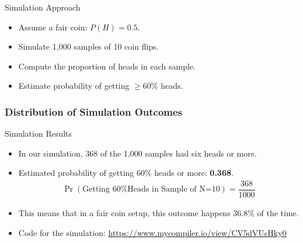 \documentclass[]{beamer} %
\begin{document}
\begin{frame}{Simulation Approach}
    \begin{itemize}
        \item Assume a fair coin: $P(H) = 0.5$.
        \item Simulate 1,000 samples of 10 coin flips.
        \item Compute the proportion of heads in each sample.
        \item Estimate probability of getting $\geq 60\%$ heads.
    \end{itemize}
\end{frame}


\begin{frame}
    \frametitle{Distribution of Simulation Outcomes}

    \begin{figure}
        \centering
    \end{figure}

\end{frame}

\begin{frame}{Simulation Results}
    \begin{itemize}
    \item In our simulation, 368 of the 1,000 samples had six heads or more. 
        \item Estimated probability of getting 60\% heads or more: \textbf{0.368}.
        \begin{align*}
            \Pr( \text{Getting 60\% Heads in Sample of N=10} ) = \dfrac{368}{1000}
        \end{align*}
        \item This means that in a fair coin setup, this outcome happens 36.8\% of the time.
        \item Code for the simulation:  
        { \href{https://www.mycompiler.io/view/CV5dVUsHky0}{https://www.mycompiler.io/view/CV5dVUsHky0}
        }
    \end{itemize}
\end{frame}
\end{document}
